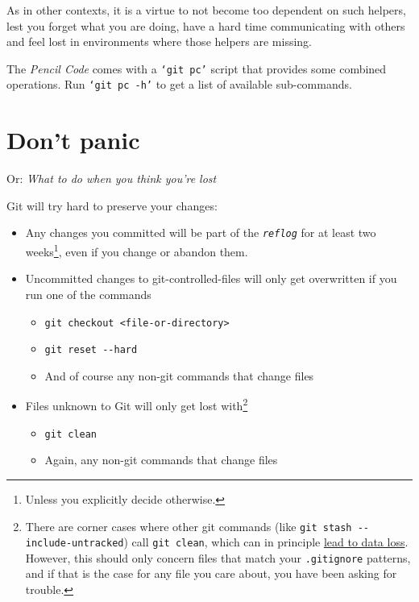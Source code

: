 \documentclass[12pt,pdftex]{article}
\begin{document}
As in other contexts, it is a virtue to not become too dependent on
such helpers, lest you forget what you are doing, have a hard time
communicating with others and feel lost in environments where those
helpers are missing.

The \emph{Pencil Code} comes with a \texttt{‘git pc’} script that provides some
combined operations.
Run \texttt{‘git pc -h’} to get a list of available sub-commands.


\section{Don't panic}
\label{sec-3}
\label{Section-dont-panic}

Or: \emph{What to do when you think you're lost}

Git will try hard to preserve your changes:

\begin{itemize}
\item Any changes you committed will be part of the \texttt{\emph{reflog}} for at least
two weeks\footnote{Unless you explicitly decide otherwise.}, even if you change or abandon them.

\item Uncommitted changes to git-controlled-files will only get overwritten
if you run one of the commands
\begin{itemize}
\item \texttt{git checkout <file-or-directory>}
\item \texttt{git reset -{}-hard}
\item And of course any non-git commands that change files
\end{itemize}

\item Files unknown to Git will only get lost with\footnote{There are corner cases where other git commands (like
\texttt{git stash -{}-include-untracked}) call \texttt{git clean}, which can in
principle \href{http://blog.icefusion.co.uk/git-stash-can-delete-ignored-files-git-stash-u/}{lead to data loss}.
However, this should only concern files that match your \texttt{.gitignore}
patterns, and if that is the case for any file you care about, you have
been asking for trouble.}
\begin{itemize}
\item \texttt{git clean}
\item Again, any non-git commands that change files
\end{itemize}
\end{itemize}
\end{document}
